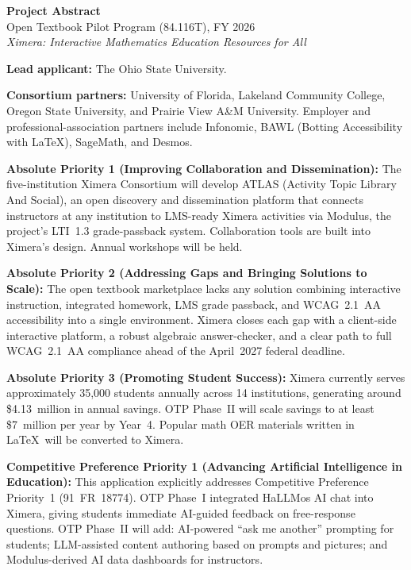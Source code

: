 \documentclass[12pt,letterpaper]{article}
\begin{document}
\singlespacing
\pagestyle{empty} %

\begin{center}
  {\bfseries Project Abstract}\\
  Open Textbook Pilot Program (84.116T), FY 2026\\
  \emph{Ximera: Interactive Mathematics Education Resources for All}
\end{center}

\noindent\textbf{Lead applicant:} The Ohio State University.

\noindent\textbf{Consortium partners:} University of Florida, Lakeland
Community College, Oregon State University, and Prairie View A\&M
University. Employer and professional-association partners include
Infonomic, BAWL (Botting Accessibility with \LaTeX), SageMath, and Desmos.

\noindent\textbf{Absolute Priority 1 (Improving Collaboration and
Dissemination):} The five-institution Ximera Consortium will develop
ATLAS (Activity Topic Library And Social), an open discovery and
dissemination platform that connects instructors at any institution to LMS-ready Ximera activities via Modulus, the project's
LTI~1.3 grade-passback system. Collaboration tools are built into Ximera's design. Annual workshops will be held.


\noindent\textbf{Absolute Priority 2 (Addressing Gaps and Bringing
Solutions to Scale):} The open textbook marketplace lacks any solution
combining interactive instruction, integrated homework, LMS grade
passback, and WCAG~2.1~AA accessibility into a single environment.
Ximera closes each gap with a client-side interactive platform, a
robust algebraic answer-checker, and a clear path to full WCAG~2.1~AA
compliance ahead of the April~2027 federal deadline. 

\noindent\textbf{Absolute Priority 3 (Promoting Student Success):}
Ximera currently serves approximately 35,000 students annually across
14 institutions, generating around \$4.13~million in annual savings. OTP Phase~II will scale savings
to at least \$7~million per year by Year~4. Popular math OER materials written in \LaTeX\ will be converted to Ximera.  



\noindent\textbf{Competitive Preference Priority 1 (Advancing
Artificial Intelligence in Education):} This application explicitly
addresses Competitive Preference Priority~1 (91~FR~18774). OTP
Phase~I integrated HaLLMos AI chat into Ximera, giving students
immediate AI-guided feedback on free-response questions. OTP Phase~II
will add: AI-powered ``ask me another'' prompting for students;
LLM-assisted content authoring based on prompts and pictures; and Modulus-derived AI data dashboards for instructors.
\end{document}
